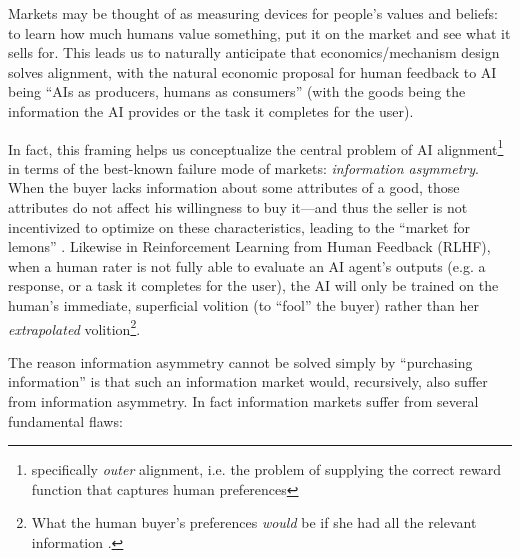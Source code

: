 Markets may be thought of as measuring devices for people's values and beliefs: to learn how much humans value something, put it on the market and see what it sells for. This leads us to naturally anticipate that economics/mechanism design solves alignment, with the natural economic proposal for human feedback to AI being ``AIs as producers, humans as consumers'' (with the goods being the information the AI provides or the task it completes for the user).

In fact, this framing helps us conceptualize the central problem of AI alignment\footnote{specifically \emph{outer} alignment, i.e. the problem of supplying the correct reward function that captures human preferences} in terms of the best-known failure mode of markets: \emph{information asymmetry}. When the buyer lacks information about some attributes of a good, those attributes do not affect his willingness to buy it---and thus the seller is not incentivized to optimize on these characteristics, leading to the ``market for lemons'' \citep{lemons}. Likewise in Reinforcement Learning from Human Feedback (RLHF), when a human rater is not fully able to evaluate an AI agent's outputs (e.g. a response, or a task it completes for the user), the AI will only be trained on the human's immediate, superficial volition (to ``fool'' the buyer) rather than her \emph{extrapolated} volition\footnote{What the human buyer's preferences \emph{would} be if she had all the relevant information \citep{yudkowskyCoherentExtrapolatedVolition2004}.}.

The reason information asymmetry cannot be solved simply by ``purchasing information'' is that such an information market would, recursively, also suffer from information asymmetry. In fact information markets suffer from several fundamental flaws:

